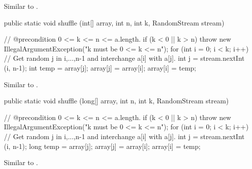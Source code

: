 \begin{tabb} Similar to 
 .
\end{tabb}
\begin{htmlonly}
\end{htmlonly}
\begin{code}

   public static void shuffle (int[] array, int n, int k,
                               RandomStream stream)\begin{hide} {
      // @precondition 0 <= k <= n <= a.length.
      if (k < 0 || k > n)
         throw new IllegalArgumentException("k must be   0 <= k <= n");
      for (int i = 0; i < k; i++) {
         // Get random j in {i,...,n-1} and interchange a[i] with a[j].
         int j = stream.nextInt (i, n-1);
         int temp = array[j];
         array[j] = array[i];
         array[i] = temp;
      }
   }\end{hide}
\end{code}
\begin{tabb} Similar to 
 .
\end{tabb}
\begin{htmlonly}
\end{htmlonly}
\begin{code}

   public static void shuffle (long[] array, int n, int k,
                               RandomStream stream)\begin{hide} {
      // @precondition 0 <= k <= n <= a.length.
      if (k < 0 || k > n)
         throw new IllegalArgumentException("k must be   0 <= k <= n");
      for (int i = 0; i < k; i++) {
         // Get random j in {i,...,n-1} and interchange a[i] with a[j].
         int j = stream.nextInt (i, n-1);
         long temp = array[j];
         array[j] = array[i];
         array[i] = temp;
      }
   }\end{hide}
\end{code}
\begin{tabb} Similar to 
 .
\end{tabb}
